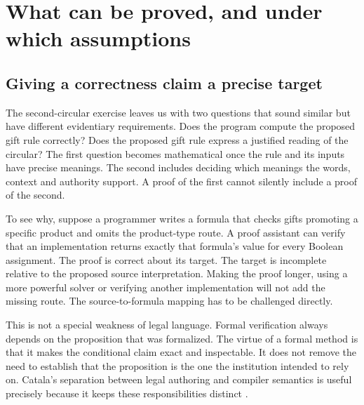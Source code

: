 \chapter{What can be proved, and under which assumptions}
\label{ch:proof}

\section{Giving a correctness claim a precise target}
\label{merge:M03:00}

\label{sec:proof-target}
The second-circular exercise leaves us with two questions that sound similar but
have different evidentiary requirements. Does the program compute the proposed
gift rule correctly? Does the proposed gift rule express a justified reading of
the circular? The first question becomes mathematical once the rule and its
inputs have precise meanings. The second includes deciding which meanings the
words, context and authority support. A proof of the first cannot silently
include a proof of the second.

To see why, suppose a programmer writes a formula that checks gifts promoting a
specific product and omits the product-type route. A proof assistant can verify
that an implementation returns exactly that formula's value for every Boolean
assignment. The proof is correct about its target. The target is incomplete
relative to the proposed source interpretation. Making the proof longer, using a
more powerful solver or verifying another implementation will not add the
missing route. The source-to-formula mapping has to be challenged directly.

This is not a special weakness of legal language. Formal verification always
depends on the proposition that was formalized. The virtue of a formal method
is that it makes the conditional claim exact and inspectable. It does not remove
the need to establish that the proposition is the one the institution intended
to rely on. Catala's separation between legal authoring and compiler semantics
is useful precisely because it keeps these responsibilities distinct
\citep[core language and compilation sections]{catala2021}.

